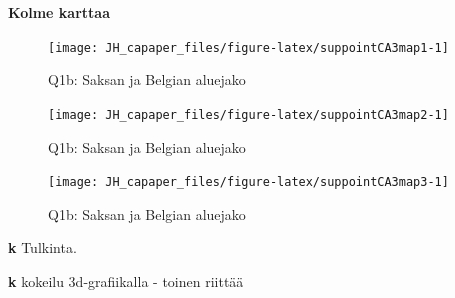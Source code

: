 \documentclass[
  finnish,
]{book}
\newenvironment{Shaded}{\begin{snugshade}}{\end{snugshade}}
\newcommand{\CommentTok}[1]{\textcolor[rgb]{0.56,0.35,0.01}{\textit{#1}}}
\newcommand{\DataTypeTok}[1]{\textcolor[rgb]{0.13,0.29,0.53}{#1}}
\newcommand{\DecValTok}[1]{\textcolor[rgb]{0.00,0.00,0.81}{#1}}
\newcommand{\KeywordTok}[1]{\textcolor[rgb]{0.13,0.29,0.53}{\textbf{#1}}}
\newcommand{\NormalTok}[1]{#1}
\newcommand{\OperatorTok}[1]{\textcolor[rgb]{0.81,0.36,0.00}{\textbf{#1}}}
\newcommand{\StringTok}[1]{\textcolor[rgb]{0.31,0.60,0.02}{#1}}
\begin{document}
\begin{Shaded}
\end{Shaded}

\textbf{Kolme karttaa}

\begin{figure}

{\centering \texttt{[image: JH\_capaper\_files/figure-latex/suppointCA3map1-1]} 

}

\caption{Q1b: Saksan ja  Belgian aluejako }\label{fig:suppointCA3map1}
\end{figure}

\begin{figure}

{\centering \texttt{[image: JH\_capaper\_files/figure-latex/suppointCA3map2-1]} 

}

\caption{Q1b: Saksan ja  Belgian aluejako }\label{fig:suppointCA3map2}
\end{figure}

\begin{figure}

{\centering \texttt{[image: JH\_capaper\_files/figure-latex/suppointCA3map3-1]} 

}

\caption{Q1b: Saksan ja  Belgian aluejako }\label{fig:suppointCA3map3}
\end{figure}

\textbf{k} Tulkinta.

\textbf{k} kokeilu 3d-grafiikalla - toinen riittää
\end{document}
